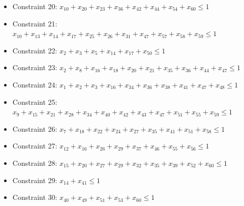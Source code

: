 \documentclass[11pt]{article}
\begin{document}
\begin{itemize}
\item Constraint 20: $x_{10} + x_{20} + x_{23} + x_{36} + x_{42} + x_{44} + x_{54} + x_{60} \le 1$
\item Constraint 21: $x_{10} + x_{13} + x_{14} + x_{17} + x_{25} + x_{26} + x_{31} + x_{47} + x_{57} + x_{58} + x_{59} \le 1$
\item Constraint 22: $x_{2} + x_{3} + x_{5} + x_{14} + x_{17} + x_{50} \le 1$
\item Constraint 23: $x_{2} + x_{8} + x_{16} + x_{18} + x_{20} + x_{21} + x_{35} + x_{36} + x_{44} + x_{47} \le 1$
\item Constraint 24: $x_{1} + x_{2} + x_{3} + x_{16} + x_{34} + x_{36} + x_{38} + x_{41} + x_{47} + x_{48} \le 1$
\item Constraint 25: $x_{9} + x_{15} + x_{21} + x_{28} + x_{34} + x_{40} + x_{42} + x_{43} + x_{47} + x_{51} + x_{55} + x_{59} \le 1$
\item Constraint 26: $x_{7} + x_{18} + x_{22} + x_{24} + x_{27} + x_{35} + x_{41} + x_{51} + x_{58} \le 1$
\item Constraint 27: $x_{12} + x_{16} + x_{26} + x_{29} + x_{37} + x_{46} + x_{55} + x_{56} \le 1$
\item Constraint 28: $x_{15} + x_{20} + x_{27} + x_{29} + x_{32} + x_{35} + x_{39} + x_{52} + x_{60} \le 1$
\item Constraint 29: $x_{14} + x_{41} \le 1$
\item Constraint 30: $x_{40} + x_{49} + x_{51} + x_{53} + x_{60} \le 1$
\end{itemize}
\end{document}

